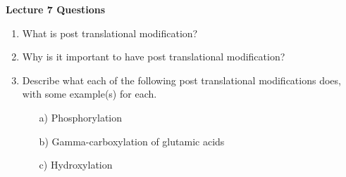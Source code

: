 \newpage
\begin{center}
\textbf{Lecture 7 Questions}
\end{center}

\begin{enumerate}

\item What is post translational modification?


\item Why is it important to have post translational modification?


\item Describe what each of the following post translational modifications does, with some example(s) for each.
\begin{itemize}
\item[a)] Phosphorylation\\
\item[b)] Gamma-carboxylation of glutamic acids\\
\item[c)] Hydroxylation\\
\end{itemize}

\end{enumerate}
